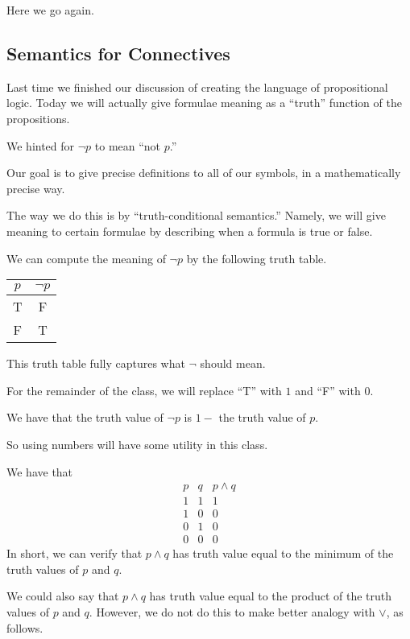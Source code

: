 
Here we go again.

\subsection{Semantics for Connectives}
Last time we finished our discussion of creating the language of propositional logic. Today we will actually give formulae meaning as a ``truth'' function of the propositions.
\begin{example}
	We hinted for $\lnot p$ to mean ``not $p$.''
\end{example}
Our goal is to give precise definitions to all of our symbols, in a mathematically precise way.

The way we do this is by ``truth-conditional semantics.'' Namely, we will give meaning to certain formulae by describing when a formula is true or false.
\begin{example}
	We can compute the meaning of $\lnot p$ by the following truth table.
	\begin{center}
		\begin{tabular}{c|c}
			$p$ & $\lnot p$ \\\hline
			T & F \\
			F & T
		\end{tabular}
	\end{center}
	This truth table fully captures what $\lnot$ should mean.
\end{example}
\begin{convention}
	For the remainder of the class, we will replace ``T'' with $1$ and ``F'' with $0$.
\end{convention}
\begin{example}
	We have that the truth value of $\lnot p$ is $1-$ the truth value of $p$.
\end{example}
So using numbers will have some utility in this class.
\begin{example}
	We have that
	\[\begin{array}{c|c||c}
		p & q & p\land q \\\hline
		1 & 1 & 1 \\
		1 & 0 & 0 \\
		0 & 1 & 0 \\
		0 & 0 & 0
	\end{array}\]
	In short, we can verify that $p\land q$ has truth value equal to the minimum of the truth values of $p$ and $q$.
\end{example}
We could also say that $p\land q$ has truth value equal to the product of the truth values of $p$ and $q$. However, we do not do this to make better analogy with $\lor$, as follows.
